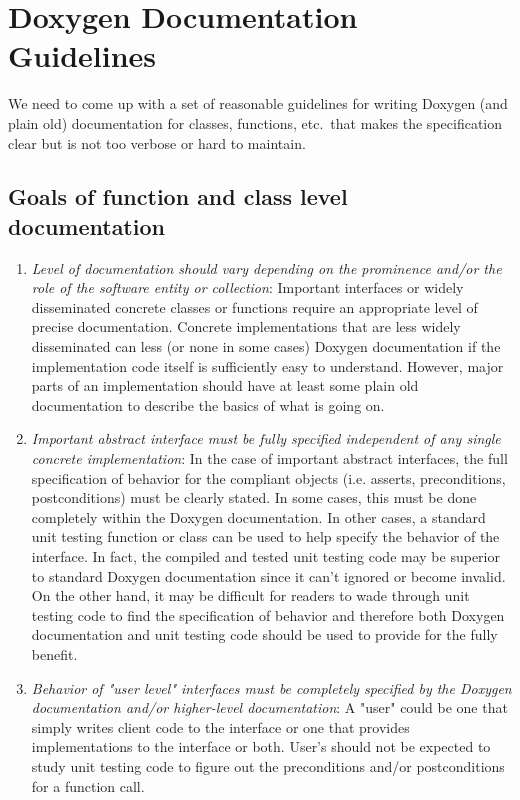 %
\section{Doxygen Documentation Guidelines}
%

We need to come up with a set of reasonable guidelines for writing Doxygen
(and plain old) documentation for classes, functions, etc.\ that makes the
specification clear but is not too verbose or hard to maintain.

%
\subsection{Goals of function and class level documentation}
%

\begin{enumerate}

{}\item\textit{Level of documentation should vary depending on the prominence
and/or the role of the software entity or collection}: Important interfaces or
widely disseminated concrete classes or functions require an appropriate level
of precise documentation.  Concrete implementations that are less widely
disseminated can less (or none in some cases) Doxygen documentation if the
implementation code itself is sufficiently easy to understand.  However, major
parts of an implementation should have at least some plain old documentation
to describe the basics of what is going on.

{}\item\textit{Important abstract interface must be fully specified
independent of any single concrete implementation}: In the case of important
abstract interfaces, the full specification of behavior for the compliant
objects (i.e. asserts, preconditions, postconditions) must be clearly stated.
In some cases, this must be done completely within the Doxygen documentation.
In other cases, a standard unit testing function or class can be used to help
specify the behavior of the interface.  In fact, the compiled and tested unit
testing code may be superior to standard Doxygen documentation since it can't
ignored or become invalid.  On the other hand, it may be difficult for readers
to wade through unit testing code to find the specification of behavior and
therefore both Doxygen documentation and unit testing code should be used to
provide for the fully benefit.

{}\item\textit{Behavior of "user level" interfaces must be completely
specified by the Doxygen documentation and/or higher-level documentation}: A
"user" could be one that simply writes client code to the interface or one
that provides implementations to the interface or both.  User's should not be
expected to study unit testing code to figure out the preconditions and/or
postconditions for a function call.


\end{enumerate}
